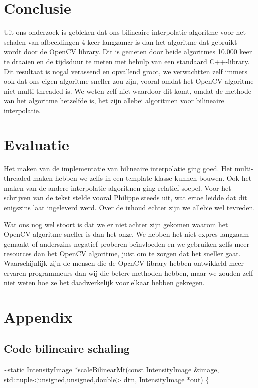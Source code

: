 \documentclass[a4paper]{article}
\begin{document}
\section{Conclusie}
\label{sec:org84fa53d}
Uit ons onderzoek is gebleken dat ons bilineaire interpolatie algoritme voor het schalen van afbeeldingen 4 keer langzamer is dan het algoritme dat gebruikt wordt door de OpenCV library. Dit is gemeten door beide algoritmes 10.000 keer te draaien en de tijdsduur te meten met behulp van een standaard C++-library. Dit resultaat is nogal verassend en opvallend groot, we verwachtten zelf immers ook dat ons eigen algoritme sneller zou zijn, vooral omdat het OpenCV algoritme niet multi-threaded is. We weten zelf niet waardoor dit komt, omdat de methode van het algoritme hetzelfde is, het zijn allebei algoritmen voor bilineaire interpolatie.

\section{Evaluatie}
\label{sec:org4bee133}
Het maken van de implementatie van bilineaire interpolatie ging goed. Het multi-threaded maken hebben we zelfs in een template klasse kunnen bouwen. Ook het maken van de andere interpolatie-algoritmen ging relatief soepel. Voor het schrijven van de tekst stelde vooral Philippe steeds uit, wat ertoe leidde dat dit enigszins laat ingeleverd werd. Over de inhoud echter zijn we allebie wel tevreden. 

Wat ons nog wel stoort is dat we er niet achter zijn gekomen waarom het OpenCV algoritme sneller is dan het onze. We hebben het niet expres langzaam gemaakt of anderszins negatief proberen beïnvloeden en we gebruiken zelfs meer resources dan het OpenCV algoritme, juist om te zorgen dat het sneller gaat. Waarschijnlijk zijn de mensen die de OpenCV library hebben ontwikkeld meer ervaren programmeurs dan wij die betere methoden hebben, maar we zouden zelf niet weten hoe ze het daadwerkelijk voor elkaar hebben gekregen. 

\section{Appendix}
\label{sec:orgd55a649}
\subsection{Code bilineaire schaling}
\label{sec:org790a334}
\textasciitilde{}static IntensityImage *scaleBilinearMt(const IntensityImage \&image,
                                       std::tuple<unsigned,unsigned,double> dim,
                                       IntensityImage *out) \{
\end{document}
